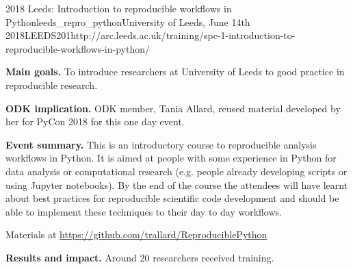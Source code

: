 \begin{event}{2018 Leeds: Introduction to reproducible workflows in Python}{leeds_repro_python}{University of Leeds, June 14th 2018}{LEEDS}{20}{1}{http://arc.leeds.ac.uk/training/spc-1-introduction-to-reproducible-workflows-in-python/}

\textbf{Main goals.} To introduce researchers at University of Leeds to good practice in reproducible research.

\textbf{ODK implication.} ODK member, Tania Allard, reused material developed by her for PyCon 2018 for this one day event.

\textbf{Event summary.} This is an introductory course to reproducible analysis workflows in Python. It is aimed at people with some experience in Python for data analysis or computational research (e.g. people already developing scripts or using Jupyter notebooks). By the end of the course the attendees will have learnt about best practices for reproducible scientific code development and should be able to implement these techniques to their day to day workflows.

Materials at \url{https://github.com/trallard/ReproduciblePython}

\textbf{Results and impact.} Around 20 researchers received training.

\end{event}
